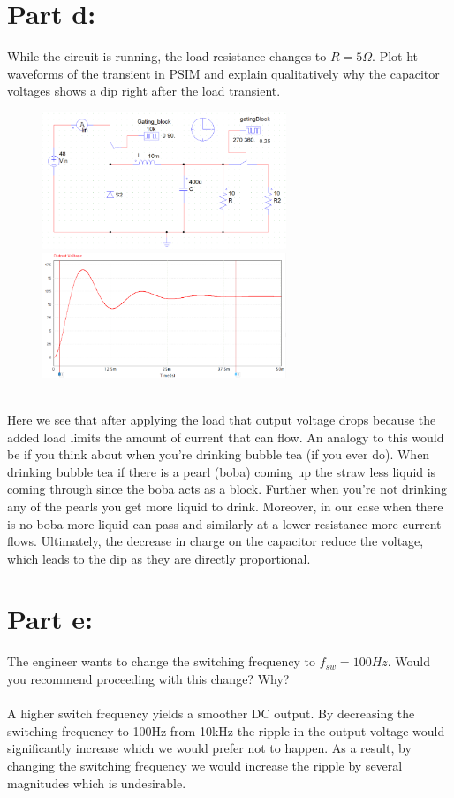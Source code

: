 \documentclass{article}
\begin{document}
\section*{Part d:}
While the circuit is running, the load resistance changes to $R = 5 \Omega$. Plot ht waveforms of the transient in PSIM and explain qualitatively why the capacitor voltages shows a dip right after the load transient.
\begin{figure}[H]
    \centering
    \includegraphics[width=0.65\textwidth]{q1d.png}\\
    \includegraphics[width=0.65\textwidth]{q1d-f.png}
    \label{Figures for Q1c}
\end{figure}
\\Here we see that after applying the load that output voltage drops because the added load limits the amount of current that can flow. An analogy to this would be if you think about when you're drinking bubble tea (if you ever do). When drinking bubble tea if there is a pearl (boba) coming up the straw less liquid is coming through since the boba acts as a block. Further when you're not drinking any of the pearls you get more liquid to drink. Moreover, in our case when there is no boba more liquid can pass and similarly at a lower resistance more current flows. Ultimately, the decrease in charge on the capacitor reduce the voltage, which leads to the dip as they are directly proportional.

\section*{Part e:}
The engineer wants to change the switching frequency to $f_{sw} = 100Hz$. Would you recommend proceeding with this change? Why?\\
\\A higher switch frequency yields a smoother DC output. By decreasing the switching frequency to 100Hz from 10kHz the ripple in the output voltage would significantly increase which we would prefer not to happen. As a result, by changing the switching frequency we would increase the ripple by several magnitudes which is undesirable. 
\end{document}

